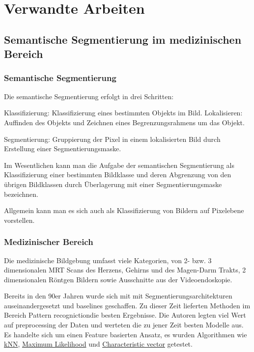 \newcommand{\source}[1]{\caption*{Source: {#1}} }

\section{Verwandte Arbeiten}\raggedbottom

\subsection{Semantische Segmentierung im medizinischen Bereich}

\subsubsection{Semantische Segmentierung}

Die semantische Segmentierung erfolgt in drei Schritten:

Klassifizierung: Klassifizierung eines bestimmten Objekts im Bild.
Lokalisieren: Auffinden des Objekts und Zeichnen eines Begrenzungsrahmens um das Objekt.

Segmentierung: Gruppierung der Pixel in einem lokalisierten Bild durch Erstellung einer Segmentierungsmaske.

Im Wesentlichen kann man die Aufgabe der semantischen Segmentierung als Klassifizierung einer bestimmten Bildklasse und deren Abgrenzung von den übrigen Bildklassen durch Überlagerung mit einer Segmentierungsmaske bezeichnen.

Allgemein kann man es sich auch als Klassifizierung von Bildern auf Pixelebene vorstellen.

\subsubsection{Medizinischer Bereich}

Die medizinische Bildgebung umfasst viele Kategorien, von 2- bzw. 3 dimensionalen MRT Scans des Herzens, Gehirns und des Magen-Darm Trakts, 2 dimensionalen Röntgen Bildern sowie Ausschnitte aus der Videoendoskopie.

Bereits in den 90er Jahren wurde sich mit mit Segmentierungsarchitekturen auseinandergesetzt und baselines geschaffen. Zu dieser Zeit lieferten Methoden im Bereich \glqq Pattern recogniction\grqq die besten Ergebnisse. Die Autoren legten viel Wert auf preprocessing der Daten und werteten die zu jener Zeit besten Modelle aus. Es handelte sich um einen Feature basierten Ansatz, es wurden Algorithmen wie
\href{https://en.wikipedia.org/wiki/K-nearest_neighbors_algorithm}{kNN},
\href{https://en.wikipedia.org/wiki/Maximum_likelihood_estimation}{Maximum Likelihood} und
\href{https://en.wikipedia.org/wiki/Eigenvalues_and_eigenvectors}{Characteristic vector} getestet.

